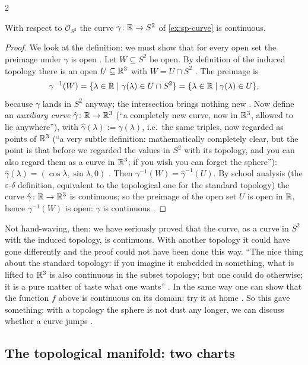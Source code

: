 \begin{paracol}{2}
\begin{theorem}\label{thm:sp-continuous}
With respect to $\mathcal O_{S^2}$ the curve $\gamma\colon\mathbb{R}\to S^2$ of \cref{ex:sp-curve} is continuous.
\end{theorem}
\begin{proof}
We look at the definition: we must show that for every open set the preimage under $\gamma$ is open . Let
$W\subseteq S^2$ be open. By definition of the induced topology there is an open $U\subseteq\mathbb{R}^3$ with $W=U\cap S^2$ .
The preimage is
\[
  \gamma^{-1}(W)=\{\lambda\in\mathbb{R}\mid\gamma(\lambda)\in U\cap S^2\}=\{\lambda\in\mathbb{R}\mid\gamma(\lambda)\in U\},
\]
because $\gamma$ lands in $S^2$ anyway; the intersection brings nothing new .
Now define an \emph{auxiliary curve} $\hat\gamma\colon\mathbb{R}\to\mathbb{R}^3$ (``a completely new curve, now in $\mathbb{R}^3$, allowed to lie anywhere''),
with $\hat\gamma(\lambda):=\gamma(\lambda)$, i.e.\ the same triples, now regarded as points of $\mathbb{R}^3$ (``a very subtle definition: mathematically
completely clear, but the point is that before we regarded the values in $S^2$ with its topology, and you can also regard them as a curve
in $\mathbb{R}^3$; if you wish you can forget the sphere''): $\hat\gamma(\lambda)=(\cos\lambda,\sin\lambda,0)$ . Then
$\gamma^{-1}(W)=\hat\gamma^{-1}(U)$. By school analysis (the $\varepsilon$-$\delta$ definition, equivalent to the topological one for the standard
topology) the curve $\hat\gamma\colon\mathbb{R}\to\mathbb{R}^3$ is continuous; so the preimage of the open set $U$ is open in $\mathbb{R}$, hence
$\gamma^{-1}(W)$ is open: $\gamma$ is continuous .
\end{proof}
Not hand-waving, then: we have seriously proved that the curve, as a curve in $S^2$ with the induced topology, is continuous. With another
topology it could have gone differently and the proof could not have been done this way. ``The nice thing about the standard topology:
if you imagine it embedded in something, what is lifted to $\mathbb{R}^3$ is also continuous in the subset topology; but one could do
otherwise; it is a pure matter of taste what one wants'' . In the same way one can show that the function $f$ above is
continuous on its domain: try it at home .
So this gave something: with a topology the sphere is not dust any longer, we can discuss whether a curve jumps .

\subsection{The topological manifold: two charts}


\end{paracol}
